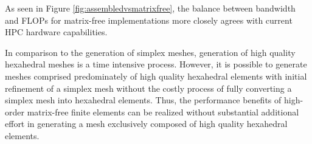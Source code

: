 As seen in Figure \ref{fig:assembledvsmatrixfree}, the balance between bandwidth and FLOPs for matrix-free implementations more closely agrees with current HPC hardware capabilities.

In comparison to the generation of simplex meshes, generation of high quality hexahedral meshes is a time intensive process.
However, it is possible to generate meshes comprised predominately of high quality hexahedral elements with initial refinement of a simplex mesh without the costly process of fully converting a simplex mesh into hexahedral elements.
Thus, the performance benefits of high-order matrix-free finite elements can be realized without substantial additional effort in generating a mesh exclusively composed of high quality hexahedral elements.
